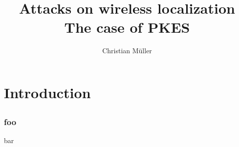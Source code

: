 \documentclass[12pt]{beamer}
\title{Attacks on wireless localization\\The case of PKES}
\author{Christian Müller}
\begin{document}
\begin{frame}
	\titlepage
\end{frame}

\begin{frame}
	\tableofcontents
\end{frame}

\section{Introduction}
\subsection*{}
\begin{frame}
	\frametitle{foo}
	bar
\end{frame}
\end{document}
